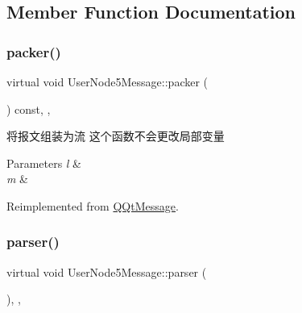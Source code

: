 \subsection{Member Function Documentation}
\mbox{\label{class_user_node5_message_a156632abacd2c3d4a4b7782d6f5d54d5}} 
\subsubsection{\texorpdfstring{packer()}{packer()}}
{\footnotesize\ttfamily virtual void User\+Node5\+Message\+::packer (\begin{DoxyParamCaption}\item[{Q\+Byte\+Array \&}]{ }\end{DoxyParamCaption}) const\hspace{0.3cm}{\ttfamily [inline]}, {\ttfamily [override]}, {\ttfamily [virtual]}}



将报文组装为流 这个函数不会更改局部变量 


\begin{DoxyParams}{Parameters}
{\em l} & \\
\hline
{\em m} & \\
\hline
\end{DoxyParams}


Reimplemented from \mbox{\hyperlink{class_q_qt_message_af1885c2c3628495808dca66ee8d72e14}{Q\+Qt\+Message}}.

\mbox{\label{class_user_node5_message_a76fbe29793cfd72a8ad9eb7dfee40dca}} 
\subsubsection{\texorpdfstring{parser()}{parser()}}
{\footnotesize\ttfamily virtual void User\+Node5\+Message\+::parser (\begin{DoxyParamCaption}\item[{const Q\+Byte\+Array \&}]{ }\end{DoxyParamCaption})\hspace{0.3cm}{\ttfamily [inline]}, {\ttfamily [override]}, {\ttfamily [virtual]}}



